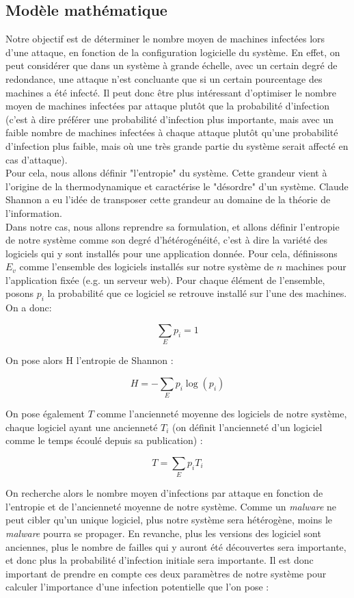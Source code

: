 \subsection{Modèle mathématique}\label{sec:modelMath}

Notre objectif est de déterminer le nombre moyen de machines infectées lors d'une attaque, en fonction de la configuration logicielle du système. En effet, on peut considérer que dans un système à grande échelle, avec un certain degré de redondance, une attaque n'est concluante que si un certain pourcentage des machines a été infecté. Il peut donc être plus intéressant d'optimiser le nombre moyen de machines infectées par attaque plutôt que la probabilité d'infection (c'est à dire préférer une probabilité d'infection plus importante, mais avec un faible nombre de machines infectées à chaque attaque plutôt qu'une probabilité d'infection plus faible, mais où une très grande partie du système serait affecté en cas d'attaque).\\
Pour cela, nous allons définir "l'entropie" du système. Cette grandeur vient à l'origine de la thermodynamique et caractérise le "désordre" d'un système. Claude Shannon a eu l'idée de transposer cette grandeur au domaine de la théorie de l'information\cite{entropie_shannon}.\\
Dans notre cas, nous allons reprendre sa formulation, et allons définir l'entropie de notre système comme son degré d'hétérogénéité, c'est à dire la variété des logiciels qui y sont installés pour une application donnée.
Pour cela, définissons $E_v$ comme l'ensemble des logiciels installés sur notre système de $n$ machines pour l'application fixée (e.g. un serveur web). Pour chaque élément de l'ensemble, posons $p_i$ la probabilité que ce logiciel se retrouve installé sur l'une des machines. 
On a donc:

\[
\sum_{E}p_i=1
\]

On pose alors H l'entropie de Shannon :

\[
H=-\sum_E p_i \log(p_i)
\]

On pose également $T$ comme l'ancienneté moyenne des logiciels de notre système, chaque logiciel ayant une ancienneté $T_i$ (on définit l'ancienneté d'un logiciel comme le temps écoulé depuis sa publication)  :

\[
T=\sum_E p_i T_i
\]

On recherche alors le nombre moyen d'infections par attaque en fonction de l'entropie et de l'ancienneté moyenne de notre système. Comme un \textit{malware} ne peut cibler qu'un unique  logiciel, plus notre système sera hétérogène, moins le \textit{malware} pourra se propager. En revanche, plus les versions des logiciel sont anciennes, plus le nombre de failles qui y auront été découvertes sera importante, et donc plus la probabilité d'infection initiale sera importante. Il est donc important de prendre en compte ces deux paramètres de notre système pour calculer l'importance d'une infection potentielle que l'on pose : 

